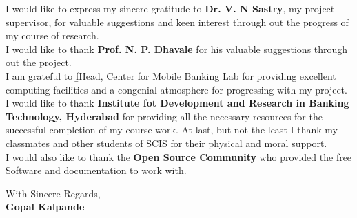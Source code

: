 I would like to express my sincere gratitude to {\bf Dr. V. N Sastry}, my project supervisor, 
for valuable suggestions and keen interest through out the progress of my course of research. \\

I would like to thank {\bf Prof. N. P. Dhavale} for his valuable suggestions through out the project.\\

I am grateful to {\b fHead, Center for Mobile Banking Lab} for providing excellent computing facilities 
and a congenial atmosphere for progressing with my project. \\

I would like to thank {\bf Institute fot Development and Research in Banking Technology, Hyderabad} for providing all the necessary resources for the successful completion of my course work. At last, but not the least I thank my classmates and 
other students of SCIS for their physical and moral support. \\

I would also like to thank the {\bf Open Source Community} who provided the free Software and documentation to work with.

\vspace{0.7in}

\begin{flushright}
With Sincere Regards,\\
{\bf Gopal Kalpande}
\end{flushright}

